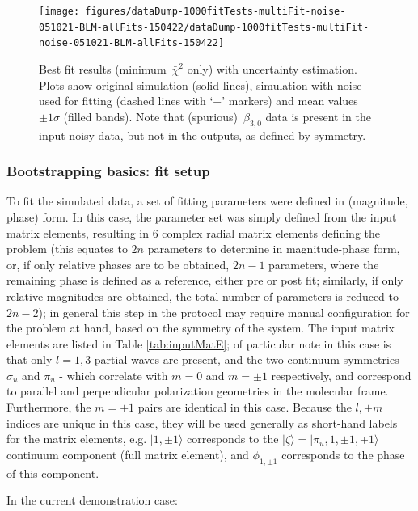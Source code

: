 \documentclass[10pt]{article}
\begin{document}
\begin{figure}[H]
\begin{center}
\texttt{[image: figures/dataDump-1000fitTests-multiFit-noise-051021-BLM-allFits-150422/dataDump-1000fitTests-multiFit-noise-051021-BLM-allFits-150422]}
\caption{{Best fit results (minimum~\(\bar{\chi}^2\) only) with uncertainty
estimation. Plots show original simulation (solid lines), simulation
with noise used for fitting (dashed lines with `+' markers) and mean
values~\(\pm1\sigma\) (filled bands). Note that
(spurious)~\(\beta_{3,0}\) data is present in the input noisy data,
but not in the outputs, as defined by symmetry.
{\label{743962}}%
}}
\end{center}
\end{figure}

\subsubsection{Bootstrapping basics: fit setup}

To fit the simulated data, a set of fitting parameters were defined in (magnitude, phase) form. In this case, the parameter set was simply defined from the input matrix elements, resulting in 6 complex radial matrix elements defining the problem (this equates to $2n$ parameters to determine in magnitude-phase form, or, if only relative phases are to be obtained, $2n-1$ parameters, where the remaining phase is defined as a reference, either pre or post fit; similarly, if only relative magnitudes are obtained, the total number of parameters is reduced to $2n-2$); in general this step in the protocol may require manual configuration for the problem at hand, based on the symmetry of the system. The input matrix elements are listed in Table \ref{tab:inputMatE}; of particular note in this case is that only $l=1,3$ partial-waves are present, and the two continuum symmetries - $\sigma_u$ and $\pi_u$ - which correlate with $m=0$ and $m=\pm1$ respectively, and correspond to parallel and perpendicular polarization geometries in the molecular frame. Furthermore, the $m=\pm1$ pairs are identical in this case. Because the $l,\pm m$ indices are unique in this case, they will be used generally as short-hand labels for the matrix elements, e.g. $|1,\pm1\rangle$ corresponds to the $|\zeta\rangle = |\pi_u,1,\pm 1,\mp 1 \rangle$ continuum component (full matrix element), and $\phi_{1,\pm1}$ corresponds to the phase of this component.

In the current demonstration case:
\end{document}
